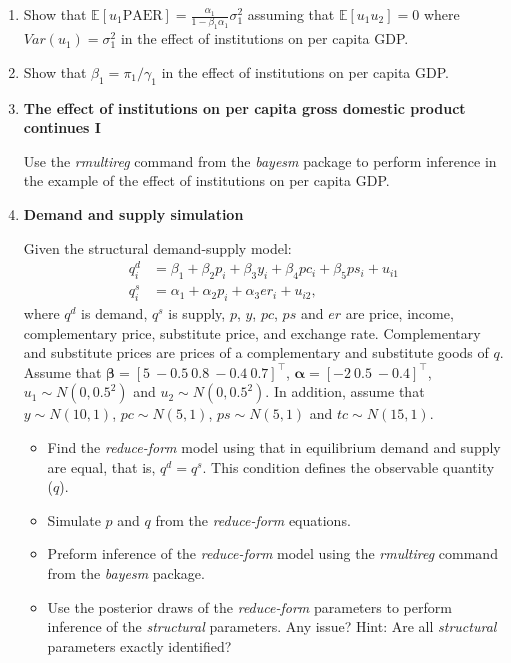 \begin{enumerate}
	\item Show that $\mathbb{E}[u_1\text{PAER}]=\frac{\alpha_1}{1-\beta_1\alpha_1}\sigma^2_1$ assuming that $\mathbb{E}[u_1u_2]=0$ where $Var(u_1)=\sigma^2_1$ in the effect of institutions on per capita GDP.
	
	\item Show that $\beta_1=\pi_1/\gamma_1$ in the effect of institutions on per capita GDP.
	
	\item \textbf{The effect of institutions on per capita gross domestic product continues I}
	
	Use the \textit{rmultireg} command from the \textit{bayesm} package to perform inference in the example of the effect of institutions on per capita GDP. 
	
	\item \textbf{Demand and supply simulation}
	
	Given the structural demand-supply model:
	\begin{align*}
		q_i^d&=\beta_1+\beta_2p_i+\beta_3y_i+\beta_4pc_i+\beta_5ps_i+u_{i1}\\
		q_i^s&=\alpha_1+\alpha_2p_i+\alpha_3er_i+u_{i2},
	\end{align*}
where $q^d$ is demand, $q^s$ is supply, $p$, $y$, $pc$, $ps$ and $er$ are price, income, complementary price, substitute price, and exchange rate. Complementary and substitute prices are prices of a complementary and substitute goods of $q$. Assume that $\bm{\beta}=\left[5 \ -0.5 \ 0.8 \ -0.4 \ 0.7\right]^{\top}$, $\bm{\alpha}=\left[-2 \ 0.5 \ -0.4\right]^{\top}$, $u_1\sim N(0, 0.5^2)$ and $u_2\sim N(0, 0.5^2)$. In addition, assume that $y\sim N(10,1)$, $pc\sim N(5,1)$, $ps\sim N(5,1)$ and $tc\sim N(15,1)$.
\begin{itemize}
	\item Find the \textit{reduce-form} model using that in equilibrium demand and supply are equal, that is, $q^d=q^s$. This condition defines the observable quantity ($q$).
	\item Simulate $p$ and $q$ from the \textit{reduce-form} equations.
	\item Preform inference of the \textit{reduce-form} model using the \textit{rmultireg} command from the \textit{bayesm} package.
	\item Use the posterior draws of the \textit{reduce-form} parameters to perform inference of the \textit{structural} parameters. Any issue? Hint: Are all \textit{structural} parameters exactly identified?   
\end{itemize}


\end{enumerate}
